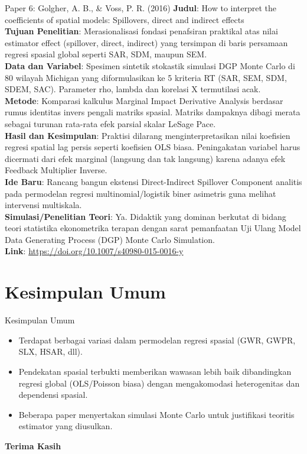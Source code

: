 \documentclass{beamer}
\begin{document}
\begin{frame}[allowframebreaks]{Paper 6: Golgher, A. B., \& Voss, P. R. (2016)}
    \textbf{Judul}: How to interpret the coefficients of spatial models: Spillovers, direct and indirect effects \\
    \textbf{Tujuan Penelitian}: Merasionalisasi fondasi penafsiran praktikal atas nilai estimator effect (spillover, direct, indirect) yang tersimpan di baris persamaan regresi spasial global seperti SAR, SDM, maupun SEM. \\
    \vspace{0.3cm}
    \textbf{Data dan Variabel}: Spesimen sintetik stokastik simulasi DGP Monte Carlo di 80 wilayah Michigan yang diformulasikan ke 5 kriteria RT (SAR, SEM, SDM, SDEM, SAC). Parameter rho, lambda dan korelasi X termutilasi acak. \\
    \vspace{0.3cm}
    \textbf{Metode}: Komparasi kalkulus Marginal Impact Derivative Analysis berdasar rumus identitas invers pengali matriks spasial. Matriks dampaknya dibagi merata sebagai turunan rata-rata efek parsial skalar LeSage Pace. \\
    \framebreak
    \textbf{Hasil dan Kesimpulan}: Praktisi dilarang menginterpretasikan nilai koefisien regresi spatial lag persis seperti koefisien OLS biasa. Peningakatan variabel harus dicermati dari efek marginal (langsung dan tak langsung) karena adanya efek Feedback Multiplier Inverse. \\
    \vspace{0.3cm}
    \textbf{Ide Baru}: Rancang bangun ekstensi Direct-Indirect Spillover Component analitis pada permodelan regresi multinomial/logistik biner asimetris guna melihat intervensi multiskala. \\
    \vspace{0.3cm}
    \textbf{Simulasi/Penelitian Teori}: Ya. Didaktik yang dominan berkutat di bidang teori statistika ekonometrika terapan dengan sarat pemanfaatan Uji Ulang Model Data Generating Process (DGP) Monte Carlo Simulation. \\
    \vspace{0.3cm}
    \textbf{Link}: \url{https://doi.org/10.1007/s40980-015-0016-y}
\end{frame}


\section{Kesimpulan Umum}
\begin{frame}{Kesimpulan Umum}
    \begin{itemize}
        \item Terdapat berbagai variasi dalam permodelan regresi spasial (GWR, GWPR, SLX, HSAR, dll).
        \item Pendekatan spasial terbukti memberikan wawasan lebih baik dibandingkan regresi global (OLS/Poisson biasa) dengan mengakomodasi heterogenitas dan dependensi spasial.
        \item Beberapa paper menyertakan simulasi Monte Carlo untuk justifikasi teoritis estimator yang diusulkan.
    \end{itemize}
\end{frame}

\begin{frame}
    \centering
    \Huge \textbf{Terima Kasih}
\end{frame}
\end{document}
